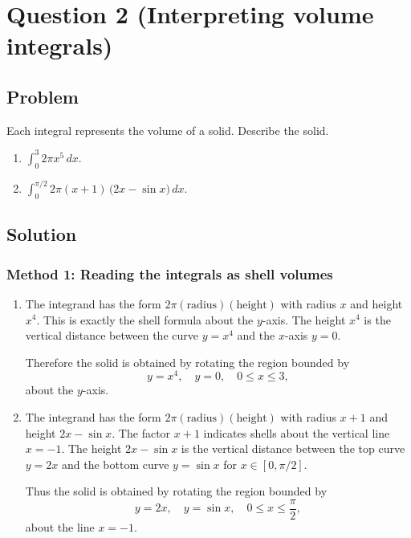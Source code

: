 \documentclass[12pt]{article}
\begin{document}
\section*{Question 2 (Interpreting volume integrals)}

\subsection*{Problem}
Each integral represents the volume of a solid. Describe the solid.
\begin{enumerate}[label=(\alph*)]
\item \(\displaystyle \int_{0}^{3} 2\pi x^{5}\,dx.\)
\item \(\displaystyle \int_{0}^{\pi/2} 2\pi(x+1)\,\big(2x-\sin x\big)\,dx.\)
\end{enumerate}

\subsection*{Solution}

\subsubsection*{Method 1: Reading the integrals as shell volumes}

\begin{enumerate}[label=(\alph*)]
\item The integrand has the form \(2\pi(\text{radius})(\text{height})\) with radius \(x\) and height \(x^{4}\). This is exactly the shell formula about the \(y\)-axis. The height \(x^{4}\) is the vertical distance between the curve \(y=x^{4}\) and the \(x\)-axis \(y=0\).

Therefore the solid is obtained by rotating the region bounded by
\[
y = x^{4},\quad y = 0,\quad 0\le x\le 3,
\]
about the \(y\)-axis.

\item The integrand has the form \(2\pi(\text{radius})(\text{height})\) with radius \(x+1\) and height \(2x-\sin x\). The factor \(x+1\) indicates shells about the vertical line \(x=-1\). The height \(2x-\sin x\) is the vertical distance between the top curve \(y=2x\) and the bottom curve \(y=\sin x\) for \(x\in[0,\pi/2]\).

Thus the solid is obtained by rotating the region bounded by
\[
y = 2x,\quad y = \sin x,\quad 0\le x\le \frac{\pi}{2},
\]
about the line \(x=-1\).
\end{enumerate}
\end{document}
